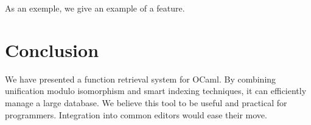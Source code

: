 \documentclass [a4paper,11pt]{scrartcl}
\begin{document}
As an exemple, we give an example of a feature.





\section{Conclusion}

We have presented a function retrieval system for OCaml. By combining unification modulo isomorphism and smart indexing techniques, it can efficiently manage a large database. We believe this tool to be useful and practical for programmers. Integration into common editors would ease their move.


\printbibliography
\end{document}
